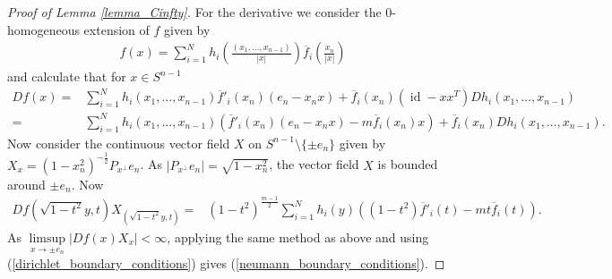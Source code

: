 \documentclass[12pt,twoside]{amsart}
\numberwithin{satz}{section}
\theoremstyle{definition}
\numberwithin{equation}{section}
\newcommand\id{\operatorname{id}}
\begin{document}
\begin{proof}[Proof of Lemma \ref{lemma_Cinfty}]
		For the derivative we consider the $0$-homogeneous extension of $f$ given by
		\begin{align*}
			f(x)=\sum_{i=1}^N h_i\left(\frac{(x_1,\dots,x_{n-1})}{|x|}\right)\overline{f}_i\left(\frac{x_n}{|x|}\right)
		\end{align*}
		and calculate that for $x\in S^{n-1}$
		\begin{align*}
			Df(x)=&\sum_{i=1}^N h_i(x_1,\dots,x_{n-1})\overline{f}'_i(x_n)(e_n-x_nx)+\overline{f}_i(x_n)(\id-xx^T)Dh_i(x_1,\dots,x_{n-1}) \\
			=& \sum_{i=1}^N h_i(x_1,\dots,x_{n-1})\left(\overline{f}'_i(x_n)(e_n-x_nx)-m\overline{f}_i(x_n)x\right) + \overline{f}_i(x_n)Dh_i(x_1,\dots,x_{n-1}).
		\end{align*}
		Now consider the continuous vector field $X$ on $S^{n-1}\setminus\{\pm e_n\}$ given by $X_x=(1-x_n^2)^{-\frac{1}{2}}P_{x^\perp}e_n$. As $|P_{x^\perp}e_n|=\sqrt{1-x_n^2}$, the vector field $X$ is bounded around $\pm e_n$. Now
		\begin{align*}
			Df(\sqrt{1-t^2}y,t)X_{(\sqrt{1-t^2}y,t)}=&(1-t^2)^{\frac{m-1}{2}}\sum_{i=1}^N h_i(y)\left((1-t^2) \overline{f}'_i(t)-mt\overline{f}_i(t)\right).
		\end{align*}
		As $\limsup\limits_{x\to \pm e_n}|Df(x)X_x|<\infty$, applying the same method as above and using (\ref{dirichlet_boundary_conditions}) gives (\ref{neumann_boundary_conditions}).
	\end{proof}
	
\end{document}
